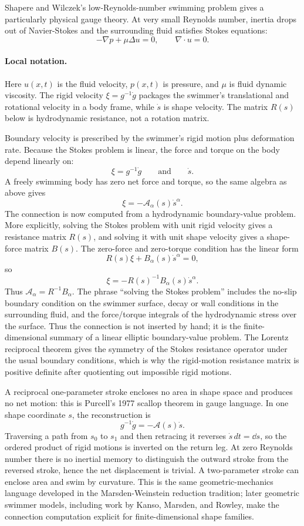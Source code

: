 Shapere and Wilczek's low-Reynolds-number swimming problem gives a particularly
physical gauge theory. At very small Reynolds number, inertia drops out of
Navier-Stokes and the surrounding fluid satisfies Stokes equations:
\[
  -\nabla p+\mu\Delta u=0,\qquad \nabla\cdot u=0.
\]

\paragraph{Local notation.}
Here \(u(x,t)\) is the fluid velocity, \(p(x,t)\) is pressure, and \(\mu\) is
fluid dynamic viscosity.  The rigid velocity \(\xi=g^{-1}\dot g\) packages the
swimmer's translational and rotational velocity in a body frame, while
\(\dot s\) is shape velocity.  The matrix \(R(s)\) below is hydrodynamic
resistance, not a rotation matrix.

Boundary velocity is prescribed by the swimmer's rigid motion plus deformation
rate. Because the Stokes problem is linear, the force and torque on the body
depend linearly on:
\[
  \xi=g^{-1}\dot g
  \qquad\text{and}\qquad
  \dot s.
\]
A freely swimming body has zero net force and torque, so the same algebra as
above gives
\[
  \xi=-\mathcal A_\alpha(s)\dot s^\alpha.
\]
The connection is now computed from a hydrodynamic boundary-value problem. More
explicitly, solving the Stokes problem with unit rigid velocity gives a
resistance matrix \(R(s)\), and solving it with unit shape velocity gives a
shape-force matrix \(B(s)\). The zero-force and zero-torque condition has the
linear form
\[
  R(s)\xi+B_\alpha(s)\dot s^\alpha=0,
\]
so
\[
  \xi=-R(s)^{-1}B_\alpha(s)\dot s^\alpha.
\]
Thus \(\mathcal A_\alpha=R^{-1}B_\alpha\).
The phrase ``solving the Stokes problem'' includes the no-slip boundary
condition on the swimmer surface, decay or wall conditions in the surrounding
fluid, and the force/torque integrals of the hydrodynamic stress over the
surface. Thus the connection is not inserted by hand; it is the
finite-dimensional summary of a linear elliptic boundary-value problem.
The Lorentz reciprocal theorem gives the symmetry of the Stokes resistance
operator under the usual boundary conditions, which is why the rigid-motion
resistance matrix is positive definite after quotienting out impossible rigid
motions.

A reciprocal one-parameter stroke encloses no area in shape space and produces
no net motion: this is Purcell's 1977 scallop theorem in gauge language. In
one shape coordinate \(s\), the reconstruction is
\[
  g^{-1}\dot g=-\mathcal A(s)\dot s.
\]
Traversing a path from \(s_0\) to \(s_1\) and then retracing it reverses
\(\dot s\,dt=\dd s\), so the ordered product of rigid motions is inverted on
the return leg. At zero Reynolds number there is no inertial memory to
distinguish the outward stroke from the reversed stroke, hence the net
displacement is trivial. A two-parameter stroke can enclose area and swim by
curvature. This is the same geometric-mechanics language developed in the
Marsden-Weinstein reduction tradition; later geometric swimmer models, including
work by Kanso, Marsden, and Rowley, make the connection computation explicit for
finite-dimensional shape families.

